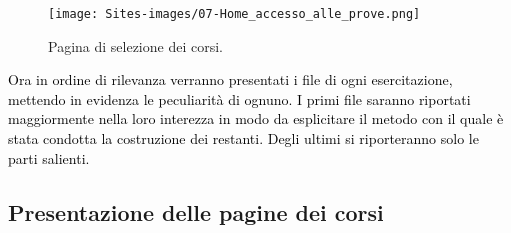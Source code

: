 \begin{figure}[H]
	\begin{center}
		\texttt{[image: Sites-images/07-Home\_accesso\_alle\_prove.png]}
		\caption{Pagina di selezione dei corsi.}
	\end{center}
\end{figure}

\textcolor{black}{Ora in ordine di rilevanza verranno presentati i file di ogni esercitazione, mettendo in evidenza le peculiarità di ognuno. I primi file saranno riportati maggiormente nella loro interezza in modo da esplicitare il metodo con il quale è stata condotta la costruzione dei restanti. Degli ultimi si riporteranno solo le parti salienti.}\\

\subsection{Presentazione delle pagine dei corsi}

